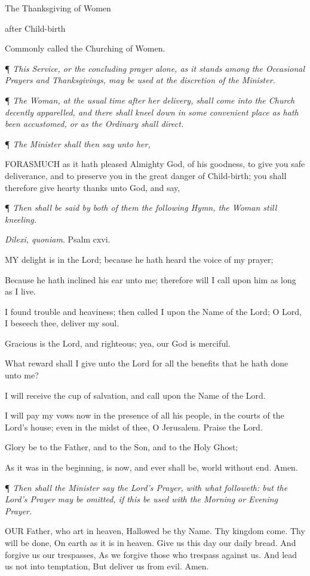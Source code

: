 The
Thanksgiving of Women 

after Child-birth

Commonly
called the Churching of Women.

¶
\emph{This Service, or the concluding prayer alone, as it stands among
the Occasional Prayers and Thanksgivings, may be used at the discretion
of the Minister.}

¶ \emph{The Woman, at the usual time after her delivery, shall come
into the Church decently apparelled, and there shall kneel down in some
convenient place as hath been accustomed, or as the Ordinary shall direct.}

¶ \emph{The Minister shall then say unto her,}

FORASMUCH
as it hath pleased Almighty God, of his goodness, to give you safe deliverance,
and to preserve you in the great danger of Child-birth; you shall therefore
give hearty thanks unto God, and say,

¶
\emph{Then shall be said by both of them the following Hymn, the Woman still
kneeling.}

\emph{Dilexi,
quoniam}. Psalm cxvi.

MY
delight is in the Lord; because he hath heard the voice of my prayer;

Because he hath inclined his ear unto me; therefore
will I call upon him as long as I live.

I found trouble and heaviness; then called I upon the
Name of the Lord; O Lord, I beseech thee, deliver my soul.

Gracious is the Lord, and righteous; yea, our God is
merciful.

What reward shall I give unto the Lord for all the
benefits that he hath done unto me?

I will receive the cup of salvation, and call upon
the Name of the Lord.

I will pay my vows now in the presence of all his people,
inthe courts of the Lord’s house; even in the midst of thee, O
Jerusalem. Praise the Lord.

Glory be to the Father, and to the Son, and to the Holy Ghost;

As it was in the beginning, is now, and ever shall
be, world without end. Amen.

¶
\emph{Then shall the Minister say the Lord's Prayer, with what followeth:
but the Lord's Prayer may be omitted, if this be used with the Morning
or Evening Prayer.}

OUR
Father, who art in heaven, Hallowed be thy Name. Thy kingdom come. Thy
will be done, On earth as it is in heaven. Give us this day our daily
bread. And forgive us our trespasses, As we forgive those who trespass
against us. And lead us not into temptation, But deliver us from evil.
Amen. 

